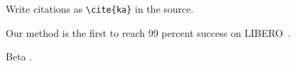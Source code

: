\documentclass{article}
\newcommand{\libero}{LIBERO~\cite{ka}}
\begin{document}
Write citations as \verb|\cite{ka}| in the source.

Our method is the first to reach 99 percent success on \libero.

Beta \cite{kb}.


\end{document}
